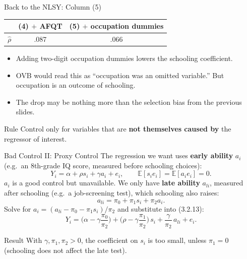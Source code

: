 \documentclass[aspectratio=169,11pt]{beamer}
\newcommand{\E}{\mathbb{E}}
\begin{document}
\begin{frame}{Back to the NLSY: Column (5)}
\small
\begin{center}
\renewcommand{\arraystretch}{1.2}
\begin{tabular}{@{}lcc@{}}
\toprule
& (4) $+$ AFQT & (5) $+$ occupation dummies\\
\midrule
$\hat\rho$ & .087 & .066\\
\bottomrule
\end{tabular}
\end{center}
\medskip
\begin{itemize}
\setlength{\itemsep}{0.5em}
\item Adding two-digit occupation dummies lowers the schooling coefficient.
\item OVB would read this as ``occupation was an omitted variable.'' But occupation is an \alert{outcome of schooling}.
\item The drop may be nothing more than the selection bias from the previous slides.
\end{itemize}
\medskip
\begin{block}{Rule}
\centering
Control only for variables that are \textbf{not themselves caused by} the regressor of interest.
\end{block}
\end{frame}

\begin{frame}{Bad Control II: Proxy Control}
\small
The regression we want uses \textbf{early ability} $a_i$ (e.g.\ an 8th-grade IQ score, measured before schooling choices):
\[
Y_i=\alpha+\rho s_i+\gamma a_i+e_i,\qquad \E[s_ie_i]=\E[a_ie_i]=0 .
\tag{3.2.13}
\]
$a_i$ is a good control but unavailable. We only have \textbf{late ability} $a_{li}$, measured after schooling (e.g.\ a job-screening test), which schooling also raises:
\[
a_{li}=\pi_0+\pi_1 s_i+\pi_2 a_i .
\tag{3.2.14}
\]
Solve for $a_i=(a_{li}-\pi_0-\pi_1 s_i)/\pi_2$ and substitute into (3.2.13):
\[
Y_i=\Big(\alpha-\gamma\frac{\pi_0}{\pi_2}\Big)
+\boxed{\Big(\rho-\gamma\frac{\pi_1}{\pi_2}\Big)}\,s_i
+\frac{\gamma}{\pi_2}\,a_{li}+e_i .
\tag{3.2.15}
\]
\begin{block}{Result}
With $\gamma,\pi_1,\pi_2>0$, the coefficient on $s_i$ is \alert{too small}, unless $\pi_1=0$ (schooling does not affect the late test).
\end{block}
\end{frame}
\end{document}
